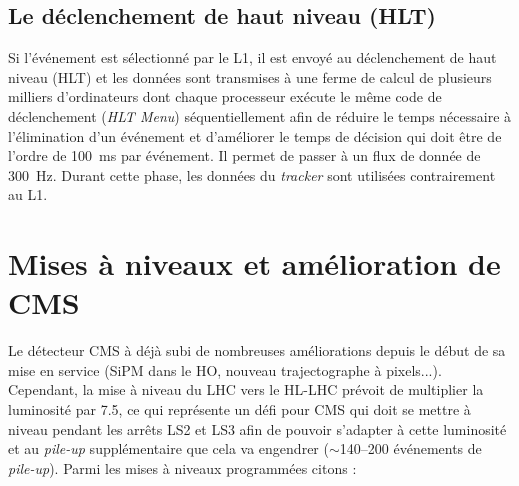 \subsection{Le déclenchement de haut niveau (HLT)}
Si l'événement est sélectionné par le L1, il est envoyé au déclenchement de haut niveau (HLT) et les données sont transmises à une ferme de calcul de plusieurs milliers d'ordinateurs  dont chaque processeur exécute le même code de déclenchement (\textit{HLT Menu}) séquentiellement afin de réduire le temps nécessaire à l'élimination d'un événement et d'améliorer le temps de décision qui doit être de l'ordre de \SI{100}{\milli\second} par événement. Il permet de passer à un flux de donnée de \SI{300}{\hertz}. Durant cette phase, les données du \textit{tracker} sont utilisées contrairement au L1.

\section{Mises à niveaux et amélioration de CMS}
Le détecteur CMS à déjà subi de nombreuses améliorations depuis le début de sa mise en service (SiPM dans le HO, nouveau trajectographe à pixels...). Cependant, la mise à niveau du LHC vers le HL-LHC prévoit de multiplier la luminosité par \num{7.5}, ce qui représente un défi pour CMS qui doit se mettre à niveau pendant les arrêts LS2 et LS3 afin de pouvoir s'adapter à cette luminosité et au \textit{pile-up} supplémentaire que cela va engendrer ($\sim$\num{140}--\num{200} événements de \textit{pile-up}). Parmi les mises à niveaux programmées citons \cite{Collaboration:1355706} \cite{Contardo:2020886} :
